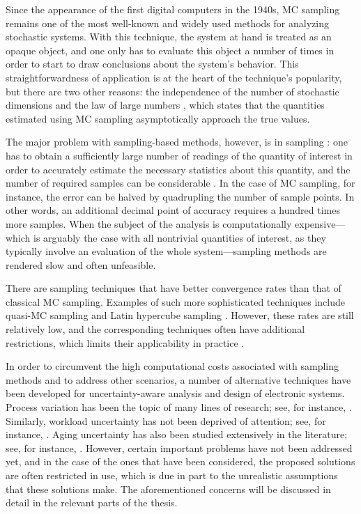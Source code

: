 Since the appearance of the first digital computers in the 1940s, \ac{MC}
sampling remains one of the most well-known and widely used methods for
analyzing stochastic systems. With this technique, the system at hand is treated
as an opaque object, and one only has to evaluate this object a number of times
in order to start to draw conclusions about the system's behavior. This
straightforwardness of application is at the heart of the technique's
popularity, but there are two other reasons: the independence of the number of
stochastic dimensions and the law of large numbers \cite{durrett2010}, which
states that the quantities estimated using \ac{MC} sampling asymptotically
approach the true values.

The major problem with sampling-based methods, however, is in sampling \perse:
one has to obtain a sufficiently large number of readings of the quantity of
interest in order to accurately estimate the necessary statistics about this
quantity, and the number of required samples can be considerable
\cite{diaz-emparanza2002}. In the case of \ac{MC} sampling, for instance, the
error can be halved by quadrupling the number of sample points. In other words,
an additional decimal point of accuracy requires a hundred times more samples.
When the subject of the analysis is computationally expensive---which is
arguably the case with all nontrivial quantities of interest, as they typically
involve an evaluation of the whole system---sampling methods are rendered slow
and often unfeasible.

There are sampling techniques that have better convergence rates than that of
classical \ac{MC} sampling. Examples of such more sophisticated techniques
include quasi-\ac{MC} sampling and Latin hypercube sampling \cite{asmussen2007}.
However, these rates are still relatively low, and the corresponding techniques
often have additional restrictions, which limits their applicability in practice
\cite{xiu2010}.

In order to circumvent the high computational costs associated with sampling
methods and to address other scenarios, a number of alternative techniques have
been developed for uncertainty-aware analysis and design of electronic systems.
Process variation has been the topic of many lines of research; see, for
instance, \cite{bhardwaj2006, vrudhula2006, bhardwaj2008, chandra2010, juan2012,
lee2013}. Similarly, workload uncertainty has not been deprived of attention;
see, for instance, \cite{diaz2002, zhu2008, schranzhofer2009, santinelli2011,
quinton2012, tanasa2015}. Aging uncertainty has also been studied extensively in
the literature; see, for instance, \cite{coskun2006, huang2009b, oboril2012,
firouzi2013, kiamehr2013, das2014c}. However, certain important problems have
not been addressed yet, and in the case of the ones that have been considered,
the proposed solutions are often restricted in use, which is due in part to the
unrealistic assumptions that these solutions make. The aforementioned concerns
will be discussed in detail in the relevant parts of the thesis.
